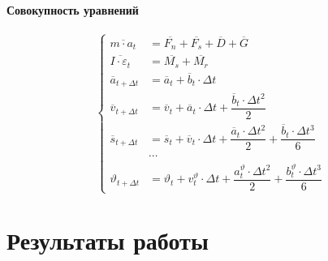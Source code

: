 \documentclass[c]{beamer}  %
\begin{document}
\begin{frame}
\frametitle{\insertsection} 
\framesubtitle{Совокупность уравнений}
\[
\left\lbrace
\begin{aligned}
\overline{m \cdot a_t} &= \overline{F_n} + \overline{F_s} + \overline{D} + \overline{G}\\
\overline{I \cdot \varepsilon_t} &= \overline{M_s} + \overline{M_r}\\
\overline{a}_{t + \Delta t} &= \overline{a}_t + \overline{b}_t \cdot \Delta t \\
\overline{v}_{t + \Delta t} &= \overline{v}_t + \overline{a}_t \cdot \Delta t + \dfrac{\overline{b}_t \cdot \Delta t^2}{2} \\
\overline{s}_{t + \Delta t} &= \overline{s}_t + \overline{v}_t \cdot \Delta t + \dfrac{\overline{a}_t \cdot \Delta t^2}{2} +  \dfrac{\overline{b}_t \cdot \Delta t^3}{6}\\
&\cdots\\
\vartheta_{t + \Delta t} &= \vartheta_t + v^{\vartheta}_t \cdot \Delta t + \dfrac{a^{\vartheta}_t \cdot \Delta t^2}{2} + \dfrac{b^{\vartheta}_t \cdot \Delta t^3}{6} 
\end{aligned}
\right.
\]


\end{frame}
























\section{Результаты работы}
\end{document}
